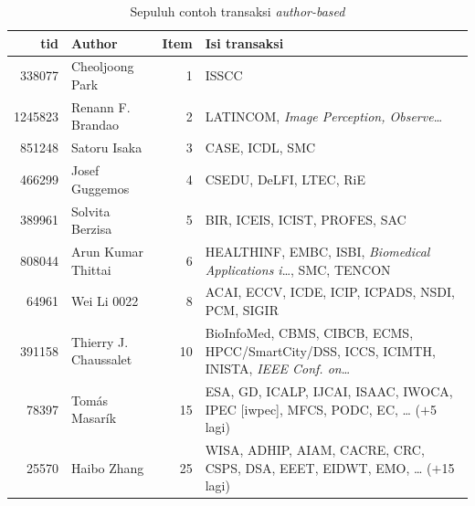 \begin{table}[ht]
\caption{Sepuluh contoh transaksi \textit{author-based}}
\label{tab:contoh-a}
\footnotesize
\begin{tabularx}{\textwidth}{@{}rlrX@{}}
\toprule
\textbf{tid} & \textbf{Author} & \textbf{Item} & \textbf{Isi transaksi} \\
\midrule
338077 & Cheoljoong Park & 1 & ISSCC \\
1245823 & Renann F. Brandao & 2 & LATINCOM, \textit{Image Perception, Observe}\ldots \\
851248 & Satoru Isaka & 3 & CASE, ICDL, SMC \\
466299 & Josef Guggemos & 4 & CSEDU, DeLFI, LTEC, RiE \\
389961 & Solvita Berzisa & 5 & BIR, ICEIS, ICIST, PROFES, SAC \\
808044 & Arun Kumar Thittai & 6 & HEALTHINF, EMBC, ISBI, \textit{Biomedical Applications i}\ldots, SMC, TENCON \\
64961 & Wei Li 0022 & 8 & ACAI, ECCV, ICDE, ICIP, ICPADS, NSDI, PCM, SIGIR \\
391158 & Thierry J. Chaussalet & 10 & BioInfoMed, CBMS, CIBCB, ECMS, HPCC/SmartCity/DSS, ICCS, ICIMTH, INISTA, \textit{IEEE Conf. on}\ldots \\
78397 & Tomás Masarík & 15 & ESA, GD, ICALP, IJCAI, ISAAC, IWOCA, IPEC [iwpec], MFCS, PODC, EC, \ldots{} ($+$5 lagi) \\
25570 & Haibo Zhang & 25 & WISA, ADHIP, AIAM, CACRE, CRC, CSPS, DSA, EEET, EIDWT, EMO, \ldots{} ($+$15 lagi) \\
\bottomrule
\end{tabularx}
\end{table}

